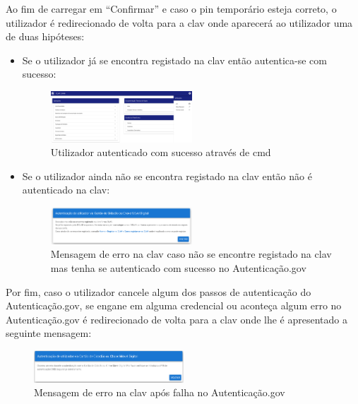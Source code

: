 Ao fim de carregar em ``Confirmar'' e caso o \acrshort{pin} temporário esteja correto, o utilizador é redirecionado de volta para a \acrshort{clav} onde aparecerá ao utilizador uma de duas hipóteses:
\begin{itemize}
    \item Se o utilizador já se encontra registado na \acrshort{clav} então autentica-se com sucesso:
    \begin{figure}[H]
        \begin{center}
            \includegraphics[width=0.5\textwidth]{img/CMDauthSuc.png}
        \end{center}
        \caption{Utilizador autenticado com sucesso através de \acrshort{cmd}}
    \end{figure}
    \item Se o utilizador ainda não se encontra registado na \acrshort{clav} então não é autenticado na \acrshort{clav}:
    \begin{figure}[H]
        \begin{center}
            \includegraphics[width=0.5\textwidth]{img/CMDnotReg.png}
        \end{center}
        \caption{Mensagem de erro na \acrshort{clav} caso não se encontre registado na \acrshort{clav} mas tenha se autenticado com sucesso no Autenticação.gov}
    \end{figure}
\end{itemize}

Por fim, caso o utilizador cancele algum dos passos de autenticação do Autenticação.gov, se engane em alguma credencial ou aconteça algum erro no Autenticação.gov é redirecionado de volta para a \acrshort{clav} onde lhe é apresentado a seguinte mensagem:

\begin{figure}[H]
    \begin{center}
        \includegraphics[width=0.5\textwidth]{img/CMDerror.png}
    \end{center}
    \caption{Mensagem de erro na \acrshort{clav} após falha no Autenticação.gov}
\end{figure}

